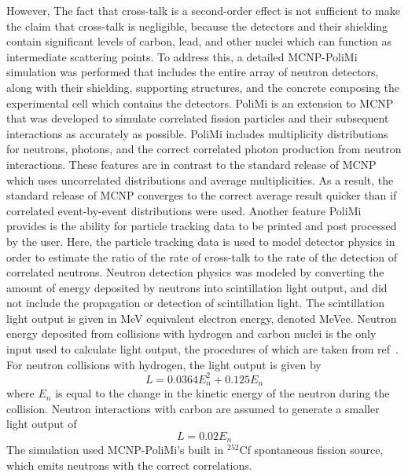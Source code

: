 However, The fact that cross-talk is a second-order effect is not sufficient to make the claim that cross-talk is negligible,
because the detectors and their shielding contain significant levels of carbon, lead, and other nuclei which can function as intermediate scattering points.
To address this, a detailed MCNP-PoliMi simulation was performed that includes the entire array of neutron detectors, along with their shielding, supporting structures, and the concrete composing the experimental cell which contains the detectors.
PoliMi is an extension to MCNP that was developed to simulate correlated fission particles and their subsequent interactions as accurately as possible.
PoliMi includes multiplicity distributions for neutrons, photons, and the correct correlated photon production from neutron interactions.
These features are in contrast to the standard release of MCNP which uses uncorrelated distributions and average multiplicities.
As a result, the standard release of MCNP converges to the correct average result quicker than if correlated event-by-event distributions were used.
Another feature PoliMi provides is the ability for particle tracking data to be printed and post processed by the user.
Here, the particle tracking data is used to model detector physics in order to estimate the ratio of the rate of cross-talk to the rate of the detection of correlated neutrons.
Neutron detection physics was modeled by converting the amount of energy deposited by neutrons into scintillation light output, and did not include the propagation or detection of scintillation light.
The scintillation light output is given in MeV equivalent electron energy, denoted MeVee.
Neutron energy deposited from collisions with hydrogen and carbon nuclei is the only input used to calculate light output, the procedures of which are taken from ref~\cite{POLIMI}.
For neutron collisions with hydrogen, the light output is given by
\begin{displaymath}
L = 0.0364 E_n^2 +  0.125 E_n
\end{displaymath}
where $E_n$ is equal to the change in the kinetic energy of the neutron during the collision.
Neutron interactions with carbon are assumed to generate a smaller light output of
\begin{displaymath}
L = 0.02 E_n
\end{displaymath}
The simulation used MCNP-PoliMi's built in $^{252}$Cf spontaneous fission source, which emits neutrons with the correct correlations.
